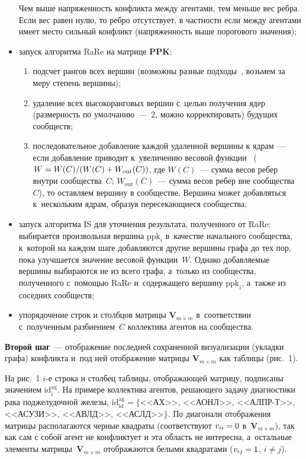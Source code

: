\begin{multicols}{2}
\begin{itemize}
  Чем выше напряженность конфликта между агентами, тем меньше вес ребра. 
Если вес равен нулю, то ребро отсутствует, в частности если между агентами 
имеет место сильный конфликт (напряженность выше порогового значения);
\item запуск алгоритма RaRe на матрице $\mathbf{PPK}$: 
\begin{enumerate}[(1)]
\item подсчет рангов 
всех вершин (возможны разные подходы~\cite{7-kir, 8-kir}, возьмем за меру 
степень вершины);
\item удаление всех высокоранговых вершин с~\mbox{целью} 
получения ядер (размерность по умолчанию~---~2, можно корректировать) 
будущих сообществ; 
\item последовательное добавление каждой удаленной 
вершины к ядрам~--- если добавление приводит к~увеличению весовой 
функции~\cite{7-kir} ($W \hm= W(C)/(W(C) \hm+ W_{\mathrm{out}}(C))$, где 
$W(C)$~--- сумма весов ребер внутри сообщества~$C$; 
$W_{\mathrm{out}}(C)$~--- сумма весов ребер вне сообщества~$C$), то оставляем 
вершину в сообществе. Вершина может добавляться к~нескольким ядрам, 
образуя пересекающиеся сообщества;
\end{enumerate}
\item запуск алгоритма IS для уточнения результата, полученного от RaRe: 
выбирается произвольная вершина $\mathrm{ppk}_i$ в~качестве начального сообщества, 
к~которой на каждом шаге добавляются другие вершины графа до тех пор, 
пока улучшается значение весовой функции~$W$. Однако добавляемые 
вершины выбираются не из всего графа, а~только из сообщества, полученного 
с~по\-мощью RaRe и~содержащего вершину $\mathrm{ppk}_i$, а~также из соседних 
сообществ;
\item упорядочение строк и столбцов матрицы $\mathbf{V}_{m\times m}$ 
в~соответствии с~полученным разбиением~$C$ коллектива агентов на 
сообщества.
\end{itemize}
  
  \textbf{Второй шаг}~--- отображение последней сохраненной визуализации 
(уклад\-ки графа) конфликта и~под ней отображение матрицы 
$\mathbf{V}_{m\times m}$ как таб\-ли\-цы  (рис.~1). 
  
  На рис.~1 $i$-е строка и столбец таб\-ли\-цы, отоб\-ра\-жа\-ющей мат\-ри\-цу, 
подписаны значением $\mathrm{id}_i^{\mathrm{ag}}$. На примере коллектива 
агентов, решающего задачу диагностики рака поджелудочной железы, 
$\mathrm{id}_{\mathrm{id}}^{\mathrm{ag}}=$\;$\{$<<АХ>>, <<АОНЛ>>, 
<<АЛПР-Т>>, <<АСУЗИ>>, <<АВЛД>>, <<АСЛД>>$\}$. По диагонали 
отображения матрицы располагаются черные квадраты (соответствуют 
$v_{ii}\hm=0$ в~$\mathbf{V}_{m\times m}$), так как сам с собой агент не 
конфликтует и эта область не интересна, а~остальные элементы 
матрицы~$\mathbf{V}_{m\times m}$ отображаются белыми квадратами 
($v_{ij}\hm=1$, $i\not= j$).
  

\end{multicols}
